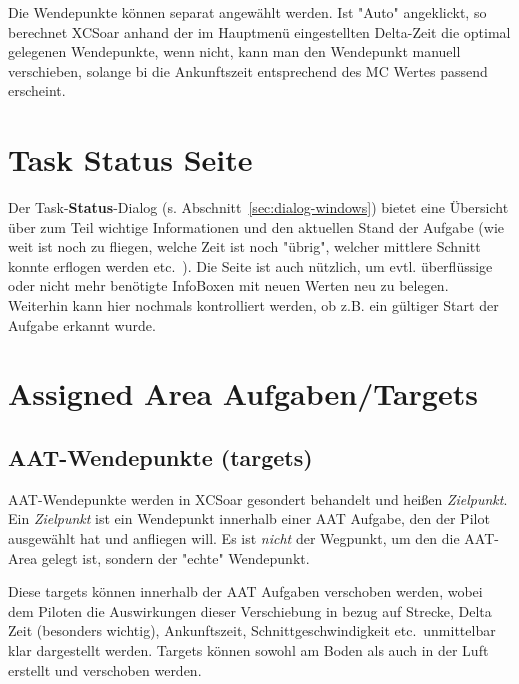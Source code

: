  Die Wendepunkte können separat angewählt werden. Ist  "Auto" angeklickt, so berechnet \textsf{XCSoar} anhand der im  Hauptmenü eingestellten Delta-Zeit die optimal gelegenen Wendepunkte, wenn nicht, kann man den Wendepunkt manuell verschieben, solange bi die Ankunftszeit entsprechend des MC Wertes passend erscheint.
%
\section{Task Status Seite}
Der Task-\textbf{Status}-Dialog (s. Abschnitt~\ref{sec:dialog-windows}) bietet eine Übersicht über zum Teil   wichtige Informationen und den aktuellen Stand der Aufgabe (wie weit ist noch zu fliegen, welche Zeit ist noch "übrig", welcher mittlere Schnitt konnte erflogen werden  etc.\ ). Die Seite ist auch nützlich, um evtl. überflüssige oder nicht mehr benötigte InfoBoxen mit neuen Werten neu zu belegen. Weiterhin kann hier nochmals kontrolliert werden, ob z.B. ein gültiger Start der Aufgabe erkannt wurde.


\section{Assigned Area Aufgaben/Targets}\label{sec:aat-tasks}
\subsection*{AAT-Wendepunkte (targets)}

AAT-Wendepunkte werden in \textsf{XCSoar} gesondert behandelt und heißen  \textcolor[rgb]{0.00,0.00,0.50}{{\em Zielpunkt}}. Ein  {\em Zielpunkt } ist ein Wendepunkt innerhalb einer AAT Aufgabe, den der Pilot ausgewählt hat und anfliegen will. Es ist \textsl{nicht} der Wegpunkt, um den die AAT-Area gelegt ist, sondern der "echte" Wendepunkt.

Diese targets können innerhalb der AAT Aufgaben verschoben werden, wobei dem Piloten die Auswirkungen dieser Verschiebung in bezug auf Strecke, Delta Zeit (besonders wichtig), Ankunftszeit, Schnittgeschwindigkeit etc.\ unmittelbar klar dargestellt werden.  Targets können sowohl am Boden als auch in der Luft erstellt und verschoben werden.

